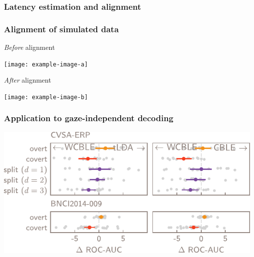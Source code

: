 \documentclass{kul-ulille-beamer}
\begin{document}
\begin{frame}
  \frametitle{Latency estimation and alignment}
\end{frame}

\begin{frame}
  \frametitle{Alignment of simulated data}
  \begin{minipage}{.45\textwidth}
    \raggedright
    \emph{Before} alignment
    \smallskip

    \texttt{[image: example-image-a]}
  \end{minipage}\hfill%
  \begin{minipage}{.45\textwidth}
    \raggedright
    \emph{After} alignment
    \smallskip


    \texttt{[image: example-image-b]}
  \end{minipage}
\end{frame}

\begin{frame}
  \frametitle{Application to gaze-independent decoding}
  \begin{minipage}{.6\textwidth}
    \centering
    \includegraphics[width=\textwidth]{figures/covert/roc_auc_diff.pdf}
  \end{minipage}\hfill
\end{frame}

\end{document}
